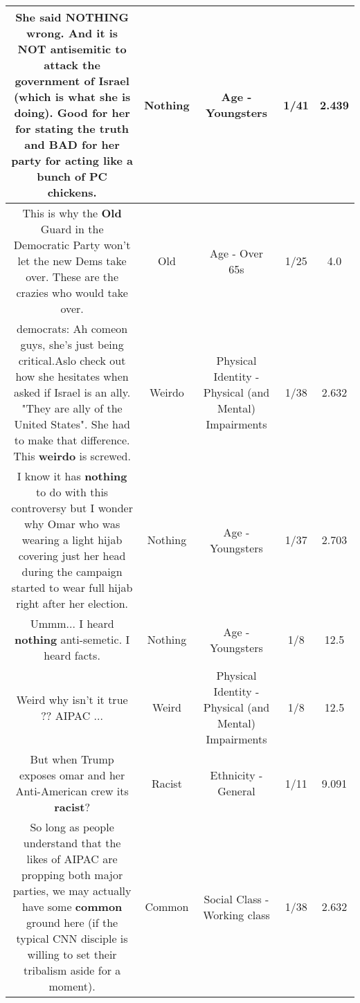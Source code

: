 \documentclass[11pt]{article}
\newlength\mylength
\begin{document}
\begin{center}
\begin{longtable}{|C{.65\mylength}|C{.30\mylength}|C{.12\mylength}|C{.12\mylength}|C{.12\mylength}|}
  \small She said \textbf{NOTHING} wrong. And it is NOT antisemitic to attack the government of Israel (which is what she is doing).  Good for her for stating the truth and BAD for her party for acting like a bunch of PC chickens.\normalsize   & Nothing & Age - Youngsters & 1/41 & 2.439 \\  \hline
  \small This is why the \textbf{Old} Guard in the Democratic Party won't let the new Dems take over. These are the crazies who would take over.\normalsize   & Old & Age - Over 65s & 1/25 & 4.0 \\  \hline
  \small democrats: Ah comeon guys, she's just being critical.Aslo check out how she hesitates when asked if Israel is an ally. "They are ally of the United States". She had to make that difference. This \textbf{weirdo} is screwed.\normalsize   & Weirdo & Physical Identity - Physical (and Mental) Impairments & 1/38 & 2.632 \\  \hline
  \small I know it has \textbf{nothing} to do with this  controversy but I wonder why Omar who was wearing a light hijab covering just her head during the campaign started to wear full hijab right after her election.\normalsize   & Nothing & Age - Youngsters & 1/37 & 2.703 \\  \hline
  \small Ummm... I heard \textbf{nothing} anti-semetic.  I heard facts.\normalsize   & Nothing & Age - Youngsters & 1/8 & 12.5 \\  \hline
  \small Weird why isn't it true ?? AIPAC ...\normalsize   & Weird & Physical Identity - Physical (and Mental) Impairments & 1/8 & 12.5 \\  \hline
  \small But when Trump exposes omar and her Anti-American crew its \textbf{racist}?\normalsize   & Racist & Ethnicity - General & 1/11 & 9.091 \\  \hline
  \small So long as people understand that the likes of AIPAC are propping both major parties, we may actually have some \textbf{common} ground here (if the typical CNN disciple is willing to set their tribalism aside for a moment).\normalsize   & Common & Social Class - Working class & 1/38 & 2.632 \\  \hline

\end{longtable}
\end{center}
\end{document}
